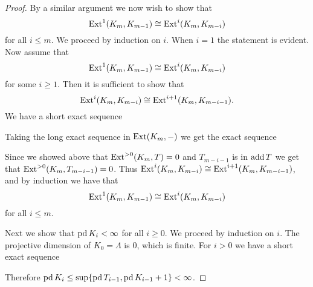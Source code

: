 \begin{theorem}
\begin{proof}
		By a similar argument we now wish to show that $$\operatorname{Ext}^1(K_m, K_{m-1}) \cong \operatorname{Ext}^{i}(K_m, K_{m-i})$$ for all $i \leq m$. We proceed by induction on $i$. When $i=1$ the statement is evident. Now assume that $$\operatorname{Ext}^1(K_m, K_{m-1}) \cong \operatorname{Ext}^{i}(K_m, K_{m-i})$$ for some $i \geq 1$. Then it is sufficient to show that $$ \operatorname{Ext}^{i}(K_m, K_{m-i}) \cong  \operatorname{Ext}^{i+1}(K_m, K_{m-i-1}).$$
		We have a short exact sequence
		\begin{center}
		\end{center}
		Taking the long exact sequence in $\operatorname{Ext}(K_m, -)$ we get the exact sequence
		\begin{center}
		\end{center}
		Since we showed above that $\operatorname{Ext}^{>0}(K_m, T) = 0$ and $T_{m-i-1}$ is in $\operatorname{add} T$ we get that $\operatorname{Ext}^{>0}(K_m, T_{m-i-1}) = 0$. Thus $\operatorname{Ext}^{i}(K_m, K_{m-i}) \cong \operatorname{Ext}^{i+1}(K_m, K_{m-i-1})$, and by induction we have that 
		$$\operatorname{Ext}^1(K_m, K_{m-1}) \cong \operatorname{Ext}^{i}(K_m, K_{m-i})$$ for all $i \leq m$.
		
		Next we show that $\operatorname{pd} K_i < \infty$ for all $i \geq 0$. We proceed by induction on $i$. The projective dimension of $K_0=\Lambda$ is 0, which is finite. For $i>0$ we have a short exact sequence
		\begin{center}
		\end{center}
		Therefore $\operatorname{pd} K_i \leq \sup\{\operatorname{pd} T_{i-1}, \operatorname{pd} K_{i-1} + 1\} < \infty$.
		

\end{proof}
\end{theorem}
